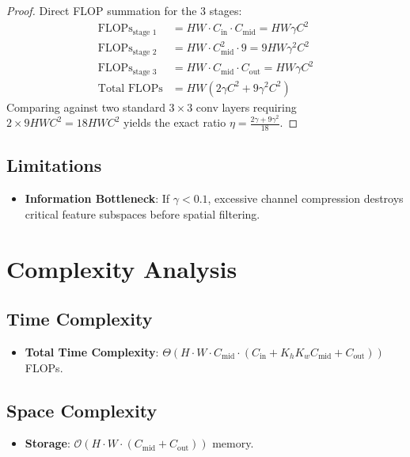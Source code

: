 \documentclass[11pt,a4paper]{article}
\theoremstyle{definition}
\begin{document}
\begin{proof}
Direct FLOP summation for the 3 stages:
\begin{align}
\text{FLOPs}_{\text{stage 1}} &= H W \cdot C_{\text{in}} \cdot C_{\text{mid}} = H W \gamma C^2 \\
\text{FLOPs}_{\text{stage 2}} &= H W \cdot C_{\text{mid}}^2 \cdot 9 = 9 H W \gamma^2 C^2 \\
\text{FLOPs}_{\text{stage 3}} &= H W \cdot C_{\text{mid}} \cdot C_{\text{out}} = H W \gamma C^2 \\
\text{Total FLOPs} &= H W (2\gamma C^2 + 9\gamma^2 C^2)
\end{align}
Comparing against two standard $3 \times 3$ conv layers requiring $2 \times 9 H W C^2 = 18 H W C^2$ yields the exact ratio $\eta = \frac{2\gamma + 9\gamma^2}{18}$.
\end{proof}

\subsection{Limitations}
\begin{itemize}
    \item \textbf{Information Bottleneck}: If $\gamma < 0.1$, excessive channel compression destroys critical feature subspaces before spatial filtering.
\end{itemize}

\section{Complexity Analysis}

\subsection{Time Complexity}
\begin{itemize}
    \item \textbf{Total Time Complexity}: $\Theta(H \cdot W \cdot C_{\text{mid}} \cdot (C_{\text{in}} + K_h K_w C_{\text{mid}} + C_{\text{out}}))$ FLOPs.
\end{itemize}

\subsection{Space Complexity}
\begin{itemize}
    \item \textbf{Storage}: $\mathcal{O}(H \cdot W \cdot (C_{\text{mid}} + C_{\text{out}}))$ memory.
\end{itemize}
\end{document}
